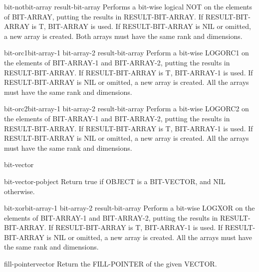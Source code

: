 \begin{function}{bit-not}{bit-array \op result-bit-array}{}
  Performs a bit-wise logical NOT on the elements of BIT-ARRAY,
  putting the results in RESULT-BIT-ARRAY. If RESULT-BIT-ARRAY is T,
  BIT-ARRAY is used. If RESULT-BIT-ARRAY is NIL or omitted, a new array is
  created. Both arrays must have the same rank and dimensions.
\end{function}

\begin{function}{bit-orc1}{bit-array-1 bit-array-2 \op result-bit-array}{}
  Perform a bit-wise LOGORC1 on the elements of BIT-ARRAY-1 and BIT-ARRAY-2,
  putting the results in RESULT-BIT-ARRAY. If RESULT-BIT-ARRAY is T,
  BIT-ARRAY-1 is used. If RESULT-BIT-ARRAY is NIL or omitted, a new array is
  created. All the arrays must have the same rank and dimensions.
\end{function}

\begin{function}{bit-orc2}{bit-array-1 bit-array-2 \op result-bit-array}{}
  Perform a bit-wise LOGORC2 on the elements of BIT-ARRAY-1 and BIT-ARRAY-2,
  putting the results in RESULT-BIT-ARRAY. If RESULT-BIT-ARRAY is T,
  BIT-ARRAY-1 is used. If RESULT-BIT-ARRAY is NIL or omitted, a new array is
  created. All the arrays must have the same rank and dimensions.
\end{function}

\begin{class}{bit-vector}{}{}
  
\end{class}

\begin{function}{bit-vector-p}{object}{}
  Return true if OBJECT is a BIT-VECTOR, and NIL otherwise.
\end{function}

\begin{function}{bit-xor}{bit-array-1 bit-array-2 \op result-bit-array}{}
  Perform a bit-wise LOGXOR on the elements of BIT-ARRAY-1 and BIT-ARRAY-2,
  putting the results in RESULT-BIT-ARRAY. If RESULT-BIT-ARRAY is T,
  BIT-ARRAY-1 is used. If RESULT-BIT-ARRAY is NIL or omitted, a new array is
  created. All the arrays must have the same rank and dimensions.
\end{function}

\begin{accessor}{fill-pointer}{vector}{}
  Return the FILL-POINTER of the given VECTOR.
\end{accessor}


